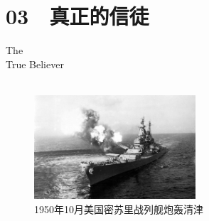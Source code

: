 \fancyhead[RO]{{\tiny{\textcolor{Gray}{\FA \ }}}\thepage}
\fancyhead[LE]{{\tiny{\textcolor{Gray}{\FA \ }}}\thepage}
\fancyfoot[LE,RO]{}
\fancyfoot[LO,CE]{}
\fancyfoot[CO,RE]{}
\chapter*{03 {\FA } 真正的信徒}
\vspace{5mm}
\begin{flushright}
	\textcolor{PinYinColor}{\EN \huge{The\\
	True Believer\\
	\ \\}}
\end{flushright}

\begin{figure}[!htbp]
	\centering
	\includegraphics[width=6cm]{./Chapters/Images/03.jpg}
	\caption*{1950年10月美国密苏里战列舰炮轰清津}
\end{figure}

